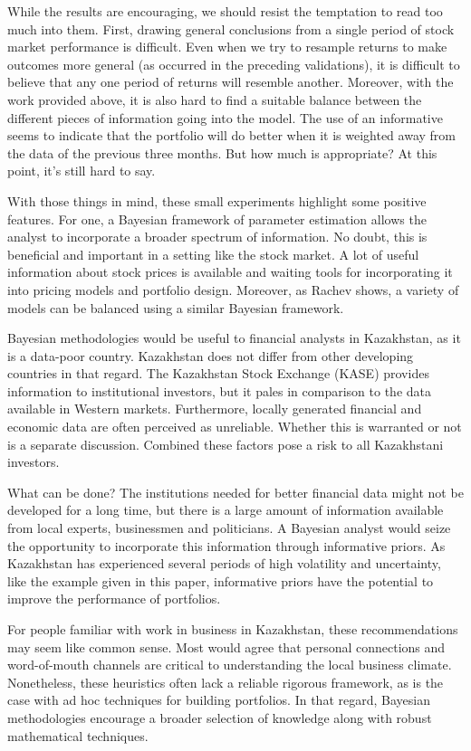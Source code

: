 \documentclass[a4paper]{article}\usepackage[]{graphicx}\usepackage[]{color}
\begin{document}
While the results are encouraging, we should resist the temptation to read too much into them. First, drawing general conclusions from a single period of stock market performance is difficult. Even when we try to resample returns to make outcomes more general (as occurred in the preceding validations), it is difficult to believe that any one period of returns will resemble another. Moreover, with the work provided above, it is also hard to find a suitable balance between the different pieces of information going into the model. The use of an informative seems to indicate that the portfolio will do better when it is weighted away from the data of the previous three months. But how much is appropriate? At this point, it's still hard to say.

With those things in mind, these small experiments highlight some positive features. For one, a Bayesian framework of parameter estimation allows the analyst to incorporate a broader spectrum of information. No doubt, this is beneficial and important in a setting like the stock market. A lot of useful information about stock prices is available and waiting tools for incorporating it into pricing models and portfolio design. Moreover, as Rachev shows, \cite{rachev04} a variety of models can be balanced using a similar Bayesian framework. 

Bayesian methodologies would be useful to financial analysts in Kazakhstan, as it is a data-poor country. Kazakhstan does not differ from other developing countries in that regard. The Kazakhstan Stock Exchange (KASE) provides information to institutional investors, but it pales in comparison to the data available in Western markets. Furthermore, locally generated financial and economic data are often perceived as unreliable. Whether this is warranted or not is a separate discussion. Combined these factors pose a risk to all Kazakhstani investors.

What can be done? The institutions needed for better financial data might not be developed for a long time, but there is a large amount of information available from local experts, businessmen and politicians. A Bayesian analyst would seize the opportunity to incorporate this information through informative priors. As Kazakhstan has experienced several periods of high volatility and uncertainty, like the example given in this paper, informative priors have the potential to improve the performance of portfolios. 

For people familiar with work in business in Kazakhstan, these recommendations may seem like common sense. Most would agree that personal connections and word-of-mouth channels are critical to understanding the local business climate. Nonetheless, these heuristics often lack a reliable rigorous framework, as is the case with ad hoc techniques for building portfolios. In that regard, Bayesian methodologies encourage a broader selection of knowledge along with robust mathematical techniques.
\end{document}
